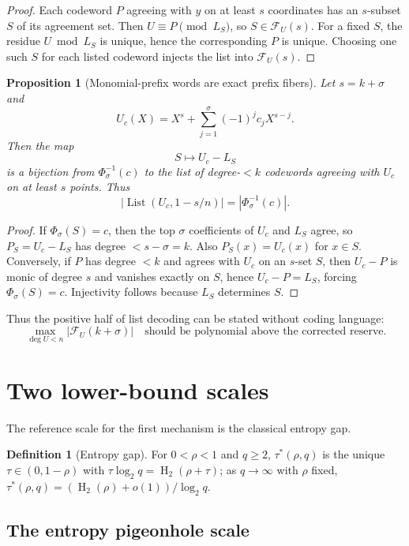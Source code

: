 \documentclass[11pt]{article}
\newtheorem{proposition}[proposition]{Proposition}
\theoremstyle{definition}
\newtheorem{definition}[definition]{Definition}
\newcommand{\HH}{\operatorname{H}_2}
\newcommand{\taustar}{\tau^{*}}
\newcommand{\Fib}{\mathcal F}
\newcommand{\List}{\operatorname{List}}
\begin{document}
\begin{proof}
Each codeword $P$ agreeing with $y$ on at least $s$ coordinates has an $s$-subset $S$ of its agreement set.  Then $U\equiv P\pmod{L_S}$, so $S\in\Fib_U(s)$.  For a fixed $S$, the residue $U\bmod L_S$ is unique, hence the corresponding $P$ is unique.  Choosing one such $S$ for each listed codeword injects the list into $\Fib_U(s)$.
\end{proof}

\begin{proposition}[Monomial-prefix words are exact prefix fibers]\label{prop:monomial-fiber}
Let $s=k+\sigma$ and
\[
        U_c(X)=X^s+\sum_{j=1}^{\sigma}(-1)^jc_jX^{s-j}.
\]
Then the map
\[
        S\longmapsto U_c-L_S
\]
is a bijection from $\Phi_\sigma^{-1}(c)$ to the list of degree-$<k$ codewords agreeing with $U_c$ on at least $s$ points.  Thus
\[
        |\List(U_c,1-s/n)|=|\Phi_\sigma^{-1}(c)|.
\]
\end{proposition}

\begin{proof}
If $\Phi_\sigma(S)=c$, then the top $\sigma$ coefficients of $U_c$ and $L_S$ agree, so $P_S=U_c-L_S$ has degree $<s-\sigma=k$.  Also $P_S(x)=U_c(x)$ for $x\in S$.  Conversely, if $P$ has degree $<k$ and agrees with $U_c$ on an $s$-set $S$, then $U_c-P$ is monic of degree $s$ and vanishes exactly on $S$, hence $U_c-P=L_S$, forcing $\Phi_\sigma(S)=c$.  Injectivity follows because $L_S$ determines $S$.
\end{proof}

Thus the positive half of list decoding can be stated without coding language:
\[
        \max_{\deg U<n}|\Fib_U(k+\sigma)|\quad\text{should be polynomial above the corrected reserve.}
\]

\section{Two lower-bound scales}\label{sec:lower}

The reference scale for the first mechanism is the classical entropy gap.

\begin{definition}[Entropy gap]\label{def:taustar}
For $0<\rho<1$ and $q\ge2$, $\taustar(\rho,q)$ is the unique $\tau\in(0,1-\rho)$ with $\tau\log_2q=\HH(\rho+\tau)$; as $q\to\infty$ with $\rho$ fixed, $\taustar(\rho,q)=(\HH(\rho)+o(1))/\log_2q$.
\end{definition}

\subsection{The entropy pigeonhole scale}\label{subsec:pigeon}
\end{document}
